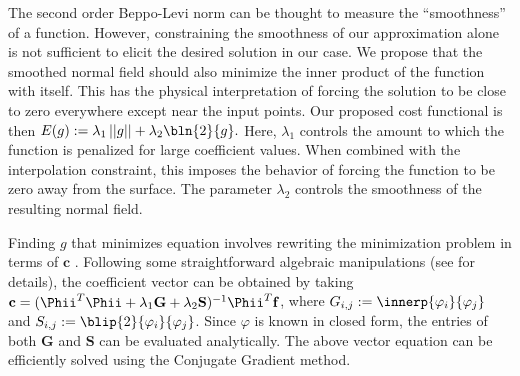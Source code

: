 The second order Beppo-Levi norm can be thought to measure the ``smoothness'' of a function. However, constraining the smoothness of our approximation alone is not sufficient to elicit the desired solution in our case. We propose that the smoothed normal field should also minimize the inner product of the function with itself. This has the physical interpretation of forcing the solution to be close to zero everywhere except near the input points. Our proposed cost functional is then $E(g) := \lambda_1 \left|\left|{g}\right|\right| + \lambda_2 \bln{2}{g}.$ Here, $\lambda_1$ controls the amount to which the function is penalized for large coefficient values. When combined with the interpolation constraint, this imposes the behavior of forcing the function to be zero away from the surface. The parameter $\lambda_2$ controls the smoothness of the resulting normal field.

Finding $g$ that minimizes equation  involves rewriting the minimization problem in terms of $\mathbf{c}$ \cite{xu2012rec}. Following some straightforward algebraic manipulations (see \cite{xu2012rec} for details), the coefficient vector can be obtained by taking $\mathbf{c} = ( \mathbf{\Phii}^T\mathbf{\Phii} + \lambda_1\mathbf{G} + \lambda_2\mathbf{S})^{-1}\mathbf{\Phii}^T\mathbf{f}$, where $G_{i,j}:=\innerp{\varphi_i}{\varphi_j}$ and $S_{i,j}:=\blip{2}{\varphi_i}{\varphi_j}$. Since $\varphi$ is known in closed form, the entries of both $\mathbf{G}$ and $\mathbf{S}$ can be evaluated analytically. The above vector equation can be efficiently solved using the Conjugate Gradient method.
